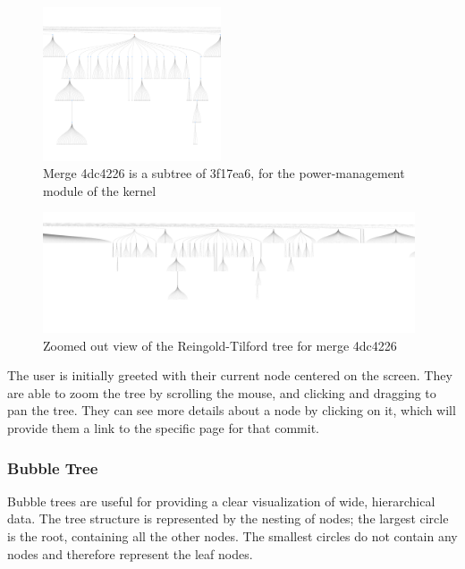       \begin{figure}
        \centering
        \includegraphics[width=0.47\textwidth]{figures/4dc4_tree.pdf}
        \caption{Merge 4dc4226 is a subtree of 3f17ea6, for the power-management
          module of the kernel}
        \label{fig:reingold_tree}
      \end{figure}

      \begin{figure}
        \centering
        \includegraphics[width=0.98\textwidth]{figures/4dc4_zoom_tree.pdf}
        \caption{Zoomed out view of the Reingold-Tilford tree for merge 4dc4226}
        \label{fig:reingold_tree_zoom}
      \end{figure}

      The user is initially greeted with their current node centered on
      the screen.  They are able to zoom the tree by scrolling the
      mouse, and clicking and dragging to pan the tree. They can see
      more details about a node by clicking on it, which will provide
      them a link to the specific page for that commit.

\subsubsection{Bubble Tree}

Bubble trees are useful for providing a clear visualization of wide,
hierarchical data\cite{Boardman2000}. The tree structure is represented
by the nesting of nodes; the largest circle is the root, containing all
the other nodes. The smallest circles do not contain any nodes and
therefore represent the leaf nodes.

